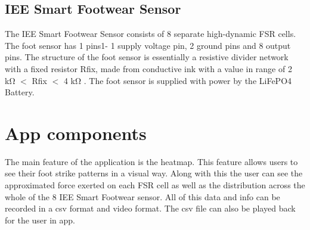 \subsection{IEE Smart Footwear Sensor}

The IEE Smart Footwear Sensor consists of 8 separate high-dynamic FSR
cells. The foot sensor has 1 pins1- 1 supply voltage pin, 2 ground pins and 8 output pins. The structure of the foot sensor is essentially a resistive divider network with a fixed resistor Rfix, made from conductive ink with a value in range of 2 kΩ $<$ Rfix $<$ 4 kΩ . The foot sensor is supplied with power by the LiFePO4 Battery.


\section{App components}

The main feature of the application is the heatmap. This feature allows users to see their foot strike patterns in a visual way. Along with this the user can see the approximated force exerted on each FSR cell as well as the distribution across the whole of the 8 IEE Smart Footwear sensor. All of this data and info can be recorded in a csv format and video format. The csv file can also be played back for the user in app.
